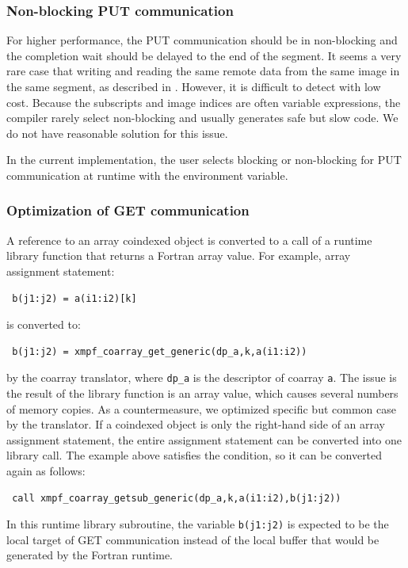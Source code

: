 \subsubsection{Non-blocking PUT communication}

For higher performance, the PUT communication should be in non-blocking and
the completion wait should be delayed to the end of the segment.
It seems a very rare case that writing and reading the same remote data from
the same image in the same segment, as described in .
However, it is difficult to detect with low cost. Because the subscripts and image
indices are often variable expressions, the compiler rarely select non-blocking
and usually generates safe but slow code.
We do not have reasonable solution for this issue.

In the current implementation, the user selects blocking or non-blocking for
PUT communication at runtime with the environment variable.


\subsubsection{Optimization of GET communication}\label{sec:opt-get}

A reference to an array coindexed object is converted to a call of a runtime library 
function that returns a Fortran array value. For example, array assignment statement:
\begin{verbatim}
 b(j1:j2) = a(i1:i2)[k] 
\end{verbatim}
is converted to:
\begin{verbatim}
 b(j1:j2) = xmpf_coarray_get_generic(dp_a,k,a(i1:i2)) 
\end{verbatim}
by the coarray translator, where {\tt dp\_a} is the descriptor of coarray {\tt a}.
The issue is the result of the library function is an array value, which
causes several numbers of memory copies.
As a countermeasure, we optimized specific but common case by the translator.
If a coindexed object is only the right-hand side of an array assignment statement,
the entire assignment statement can be converted into one library call.
The example above satisfies the condition, so it can be converted again as follows:
\begin{verbatim}
 call xmpf_coarray_getsub_generic(dp_a,k,a(i1:i2),b(j1:j2)) 
\end{verbatim}
In this runtime library subroutine, the variable {\tt b(j1:j2)} is expected to be 
the local target of GET communication instead of the local buffer that would be
generated by the Fortran runtime.


